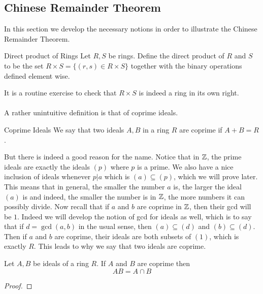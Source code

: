 \documentclass[a4paper]{article}
\begin{document}
\subsection{Chinese Remainder Theorem}
In this section we develop the necessary notions in order to illustrate the Chinese Remainder Theorem. 

\begin{defn}{Direct product of Rings}{} Let $R,S$ be rings. Define the direct product of $R$ and $S$ to be the set $R\times S=\{(r,s)\in R\times S\}$ together with the binary operations defined element wise. 
\end{defn}

It is a routine exercise to check that $R\times S$ is indeed a ring in its own right. \\~\\

A rather unintuitive definition is that of coprime ideals. 

\begin{defn}{Coprime Ideals}{} We say that two ideals $A,B$ in a ring $R$ are coprime if $A+B=R$. 
\end{defn}

But there is indeed a good reason for the name. Notice that in $\mathbb{Z}$, the prime ideals are exactly the ideals $(p)$ where $p$ is a prime. We also have a nice inclusion of ideals whenever $p|a$ which is $(a)\subseteq(p)$, which we will prove later. This means that in general, the smaller the number $a$ is, the larger the ideal $(a)$ is and indeed, the smaller the number is in $\mathbb{Z}$, the more numbers it can possibly divide. Now recall that if $a$ and $b$ are coprime in $\mathbb{Z}$, then their gcd will be $1$. Indeed we will develop the notion of gcd for ideals as well, which is to say that if $d=\gcd(a,b)$ in the usual sense, then $(a)\subseteq(d)$ and $(b)\subseteq(d)$. Then if $a$ and $b$ are coprime, their ideals are both subsets of $(1)$, which is exactly $R$. This leads to why we say that two ideals are coprime. 

\begin{prp}{}{} Let $A,B$ be ideals of a ring $R$. If $A$ and $B$ are coprime then $$AB=A\cap B$$ \tcbline
\begin{proof}

\end{proof}
\end{prp}
\end{document}
